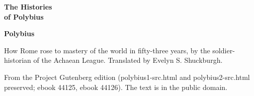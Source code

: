 \documentclass[11pt,letterpaper]{article}
\begin{document}
\color{ink}

\begin{titlepage}
\centering
\vspace*{4em}
{\LARGE\bfseries\color{heading} The Histories\\[0.3em]of Polybius\par}
\vspace{2em}
{\Large\bfseries\color{heading} Polybius\par}
\vspace{2.5em}
{\itshape\color{subhead}\parbox{0.8\linewidth}{\centering How Rome rose to mastery of the world in fifty-three years, by the soldier-historian of the Achaean League. Translated by Evelyn S. Shuckburgh.\par}}
\vfill
{\small From the Project Gutenberg edition (polybius1-src.html and polybius2-src.html preserved; ebook 44125, ebook 44126). The text is in the public domain.\par}
\vspace{2em}
\end{titlepage}

\tableofcontents


\end{document}
